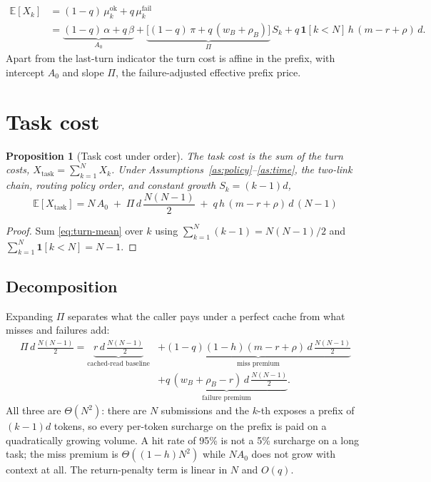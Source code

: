 \documentclass[11pt]{article}
\newtheorem{proposition}{Proposition}
\newcommand{\E}{\mathbb{E}}
\newcommand{\ind}{\mathbf{1}}
\begin{document}
\begin{equation}\label{eq:turn-mean}
\begin{split}
  \E[X_k] &= (1-q)\,\mu_k^{\text{ok}} + q\,\mu_k^{\text{fail}} \\
  &= \underbrace{(1-q)\,\alpha + q\,\beta}_{A_0}
  + \underbrace{\big[(1-q)\,\pi + q\,(w_B + \rho_B)\big]}_{\Pi}\, S_k
  + q\,\ind[k<N]\,h\,(m-r+\rho)\,d .
\end{split}
\end{equation}
Apart from the last-turn indicator the turn cost is affine in the prefix, with
intercept $A_0$ and slope $\Pi$, the failure-adjusted effective prefix price.

\section{Task cost}

\begin{proposition}[Task cost under \textsf{order}]\label{prop:task}
The task cost is the sum of the turn costs, $X_{\text{task}} = \sum_{k=1}^N X_k$.
Under Assumptions~\ref{as:policy}--\ref{as:time}, the two-link chain, routing
policy \textsf{order}, and constant growth $S_k = (k-1)d$,
\begin{equation}\label{eq:task-mean}
  \boxed{\;
  \E[X_{\text{task}}]
  = N\, A_0 \;+\; \Pi\, d\, \frac{N(N-1)}{2} \;+\; q\,h\,(m-r+\rho)\,d\,(N-1)
  \;}
\end{equation}
\end{proposition}
\begin{proof}
Sum \eqref{eq:turn-mean} over $k$ using $\sum_{k=1}^{N}(k-1) = N(N-1)/2$ and
$\sum_{k=1}^{N}\ind[k<N] = N-1$.
\end{proof}

\subsection{Decomposition}

Expanding $\Pi$ separates what the caller pays under a perfect cache from what
misses and failures add:
\begin{equation}\label{eq:decomp}
\begin{split}
  \Pi\, d\, \frac{N(N-1)}{2}
  = \underbrace{r\, d\, \tfrac{N(N-1)}{2}}_{\text{cached-read baseline}}
  &+ \underbrace{(1-q)(1-h)(m - r + \rho)\, d\, \tfrac{N(N-1)}{2}}_{\text{miss premium}} \\
  &+ \underbrace{q\,(w_B + \rho_B - r)\, d\, \tfrac{N(N-1)}{2}}_{\text{failure premium}} .
\end{split}
\end{equation}
All three are $\Theta(N^2)$: there are $N$ submissions and the $k$-th exposes a
prefix of $(k-1)d$ tokens, so every per-token surcharge on the prefix is paid on
a quadratically growing volume. A hit rate of 95\% is not a 5\% surcharge on a
long task; the miss premium is $\Theta((1-h)N^2)$ while $N A_0$ does not grow
with context at all. The return-penalty term is linear in $N$ and $O(q)$.
\end{document}
